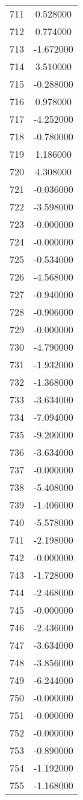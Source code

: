\documentclass[12pt]{article}
\begin{document}
\begin{longtable}{@{}cc@{}}
711 & 0.528000 \\
712 & 0.774000 \\
713 & -1.672000 \\
714 & 3.510000 \\
715 & -0.288000 \\
716 & 0.978000 \\
717 & -4.252000 \\
718 & -0.780000 \\
719 & 1.186000 \\
720 & 4.308000 \\
721 & -0.036000 \\
722 & -3.598000 \\
723 & -0.000000 \\
724 & -0.000000 \\
725 & -0.534000 \\
726 & -4.568000 \\
727 & -0.940000 \\
728 & -0.906000 \\
729 & -0.000000 \\
730 & -4.790000 \\
731 & -1.932000 \\
732 & -1.368000 \\
733 & -3.634000 \\
734 & -7.094000 \\
735 & -9.200000 \\
736 & -3.634000 \\
737 & -0.000000 \\
738 & -5.408000 \\
739 & -1.406000 \\
740 & -5.578000 \\
741 & -2.198000 \\
742 & -0.000000 \\
743 & -1.728000 \\
744 & -2.468000 \\
745 & -0.000000 \\
746 & -2.436000 \\
747 & -3.634000 \\
748 & -3.856000 \\
749 & -6.244000 \\
750 & -0.000000 \\
751 & -0.000000 \\
752 & -0.000000 \\
753 & -0.890000 \\
754 & -1.192000 \\
755 & -1.168000 \\

\end{longtable}
\end{document}

